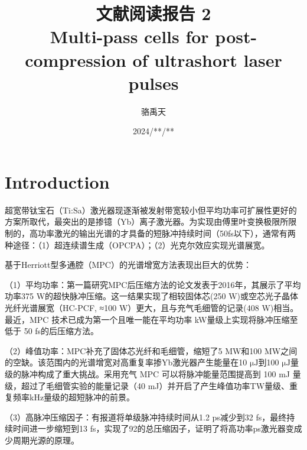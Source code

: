 \documentclass[14pt,a4paper,oneside]{article}
\title{\textbf{文献阅读报告 2\\Multi-pass cells for post-compression of ultrashort laser pulses}}                           %
\author{骆禹天}                                           %
\date{2024/**/**}                                        %
\numberwithin{equation}{subsection}             %
\numberwithin{figure}{subsection}               %
\begin{document}

\maketitle

\setcounter{page}{1}          %


\tableofcontents              %

\newpage                      
\setcounter{page}{1}          %








\section{Introduction}

超宽带钛宝石（Ti:Sa）激光器现逐渐被发射带宽较小但平均功率可扩展性更好的方案所取代，最突出的是掺镱（Yb）离子激光器。为实现由傅里叶变换极限所限制的，高功率激光的输出光谱的才具备的短脉冲持续时间（50fs以下），通常有两种途径：（1）超连续谱生成（OPCPA）；（2）光克尔效应实现光谱展宽。

基于Herriott型多通腔（MPC）的光谱增宽方法表现出巨大的优势：

（1）平均功率：第一篇研究MPC后压缩方法的论文发表于2016年，其展示了平均功率375 W的超快脉冲压缩。这一结果实现了相较固体芯(250 W)或空芯光子晶体光纤光谱展宽（HC-PCF, ≈100 W）更大，且与充气毛细管的记录(408 W)相当。\cite{schulteNonlinearPulseCompression2016}最近，MPC 技术已成为第一个且唯一能在平均功率 kW量级上实现将脉冲压缩至低于 50 fs的后压缩方法。\cite{grebingKilowattaveragepowerCompressionMillijoule2020}

（2）峰值功率：MPC补充了固体芯光纤和毛细管，缩短了5 MW和100 MW之间的空缺。该范围内的光谱增宽对高重复率掺Yb激光器产生能量在10 $\mathrm{\mu J}$到100 $\mathrm{\mu J}$量级的脉冲构成了重大挑战。\cite{schulteNonlinearPulseCompression2016}采用充气 MPC 可以将脉冲能量范围提高到 100 mJ 量级，\cite{kaumannsSpectralBroadening1122021}超过了毛细管实验的能量记录（40 mJ）并开启了产生峰值功率TW量级、重复频率kHz量级的超短脉冲的前景。

（3）高脉冲压缩因子：有报道将单级脉冲持续时间从1.2 ps减少到32 fs，最终持续时间进一步缩短到13 fs，实现了92的总压缩因子，\cite{ballaPostcompressionPicosecondPulses2020}证明了将高功率ps激光器变成少周期光源的原理。
\end{document}
